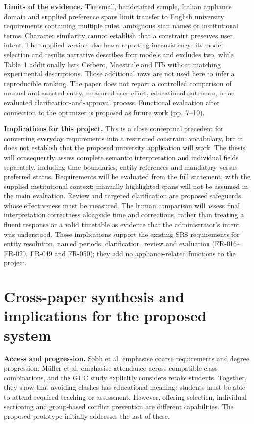 \documentclass[
  11pt,a4paper,oneside]{report}
\begin{document}
\textbf{Limits of the evidence.} The small, handcrafted sample, Italian appliance domain and supplied preference spans limit transfer to English university requirements containing multiple rules, ambiguous staff names or institutional terms. Character similarity cannot establish that a constraint preserves user intent. The supplied version also has a reporting inconsistency: its model-selection and results narrative describes four models and excludes two, while Table~1 additionally lists Cerbero, Maestrale and IT5 without matching experimental descriptions. Those additional rows are not used here to infer a reproducible ranking. The paper does not report a controlled comparison of manual and assisted entry, measured user effort, educational outcomes, or an evaluated clarification-and-approval process. Functional evaluation after connection to the optimizer is proposed as future work (pp.~7--10).

\textbf{Implications for this project.} This is a close conceptual precedent for converting everyday requirements into a restricted constraint vocabulary, but it does not establish that the proposed university application will work. The thesis will consequently assess complete semantic interpretation and individual fields separately, including time boundaries, entity references and mandatory versus preferred status. Requirements will be evaluated from the full statement, with the supplied institutional context; manually highlighted spans will not be assumed in the main evaluation. Review and targeted clarification are proposed safeguards whose effectiveness must be measured. The human comparison will assess final interpretation correctness alongside time and corrections, rather than treating a fluent response or a valid timetable as evidence that the administrator's intent was understood. These implications support the existing SRS requirements for entity resolution, named periods, clarification, review and evaluation (FR-016--FR-020, FR-049 and FR-050); they add no appliance-related functions to the project.

\section{Cross-paper synthesis and implications for the proposed system}
\textbf{Access and progression.} Sobh et al. emphasise course requirements and degree progression, Müller et al. emphasise attendance across compatible class combinations, and the GUC study explicitly considers retake students. Together, they show that avoiding clashes has educational meaning: students must be able to attend required teaching or assessment. However, offering selection, individual sectioning and group-based conflict prevention are different capabilities. The proposed prototype initially addresses the last of these.
\end{document}
